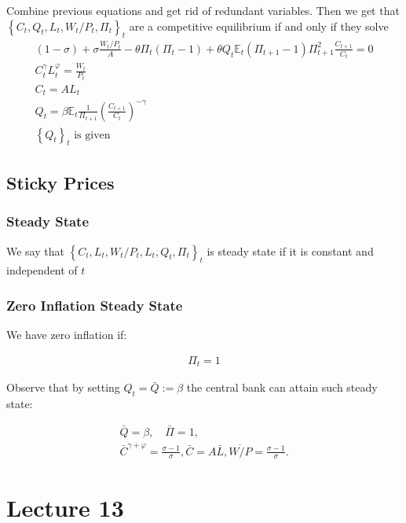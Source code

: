 \documentclass[10pt]{article}
\begin{document}
Combine previous equations and get rid of redundant variables. Then we get that 
$\left\{C_t, Q_t, L_t, W_t / P_t, \Pi_t\right\}_t$ are a competitive equilibrium if and only if they solve
$$
\begin{gathered}
(1-\sigma)+\sigma \frac{W_t / P_t}{A}-\theta \Pi_t\left(\Pi_t-1\right)+\theta Q_t \mathbb{E}_t\left(\Pi_{t+1}-1\right) \Pi_{t+1}^2 \frac{C_{t+1}}{C_t}=0 \\
C_t^\gamma L_t^{\varphi}=\frac{W_t}{P_t} \\
C_t=A L_t \\
Q_t=\beta \mathbb{E}_t \frac{1}{\Pi_{t+1}}\left(\frac{C_{t+1}}{C_t}\right)^{-\gamma} \\
\left\{Q_t\right\}_t \text { is given }
\end{gathered}
$$

\subsection{Sticky Prices}

\subsubsection{Steady State}

We say that 
$\left\{C_t, L_t, W_t / P_t, L_t, Q_t, \Pi_t\right\}_t$ 
is steady state if it is constant and 
independent of $t$

\subsubsection{Zero Inflation Steady State}

We have zero inflation if:

\begin{align}
    \Pi_t=1
\end{align}

Observe that by setting $Q_t=\bar{Q}:=\beta$ the central bank can attain such steady state:

$$
\begin{gathered}
\bar{Q}=\beta, \quad \bar{\Pi}=1, \\
\bar{C}^{\gamma+\varphi}=\frac{\sigma-1}{\sigma}, \bar{C}=A \bar{L}, \overline{W / P}=\frac{\sigma-1}{\sigma} .
\end{gathered}
$$


\section{Lecture 13}
\end{document}

